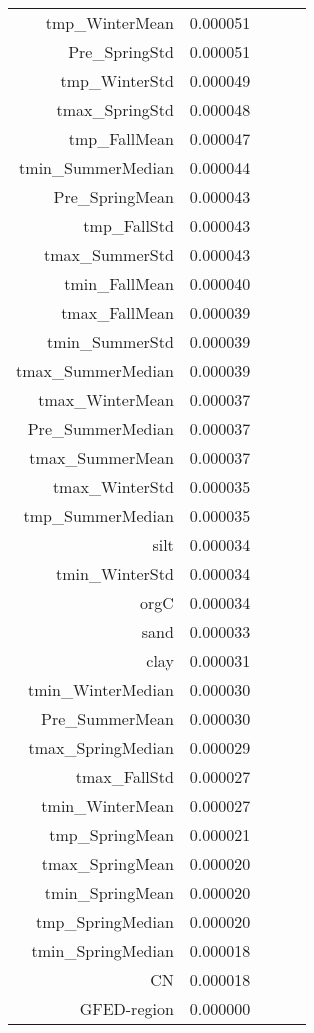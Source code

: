 \begin{tabular}{rrrrr}
tmp_WinterMean & 0.000051 \\
Pre_SpringStd & 0.000051 \\
tmp_WinterStd & 0.000049 \\
tmax_SpringStd & 0.000048 \\
tmp_FallMean & 0.000047 \\
tmin_SummerMedian & 0.000044 \\
Pre_SpringMean & 0.000043 \\
tmp_FallStd & 0.000043 \\
tmax_SummerStd & 0.000043 \\
tmin_FallMean & 0.000040 \\
tmax_FallMean & 0.000039 \\
tmin_SummerStd & 0.000039 \\
tmax_SummerMedian & 0.000039 \\
tmax_WinterMean & 0.000037 \\
Pre_SummerMedian & 0.000037 \\
tmax_SummerMean & 0.000037 \\
tmax_WinterStd & 0.000035 \\
tmp_SummerMedian & 0.000035 \\
silt & 0.000034 \\
tmin_WinterStd & 0.000034 \\
orgC & 0.000034 \\
sand & 0.000033 \\
clay & 0.000031 \\
tmin_WinterMedian & 0.000030 \\
Pre_SummerMean & 0.000030 \\
tmax_SpringMedian & 0.000029 \\
tmax_FallStd & 0.000027 \\
tmin_WinterMean & 0.000027 \\
tmp_SpringMean & 0.000021 \\
tmax_SpringMean & 0.000020 \\
tmin_SpringMean & 0.000020 \\
tmp_SpringMedian & 0.000020 \\
tmin_SpringMedian & 0.000018 \\
CN & 0.000018 \\
GFED-region & 0.000000 \\
\bottomrule
\end{tabular}
